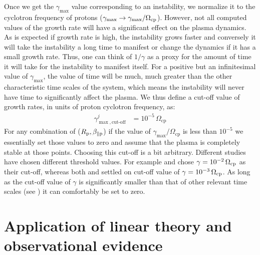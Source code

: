             Once we get the $\gamma_{\max}$ value corresponding to an instability, we normalize it
            to the cyclotron frequency of protons ($\gamma_{\max} \rightarrow
            \gamma_{\max}/\Omega_{\rm cp}$). However, not all computed values of the growth rate
            will have a significant effect on the plasma dynamics. As is expected if growth rate is
            high, the instability grows faster and conversely it will take the instability a long
            time to manifest or change the dynamics if it has a small growth rate. Thus, one can
            think of $1/\gamma$ as a proxy for the amount of time it will take for the instability
            to manifest itself. For a positive but an infinitesimal value of $\gamma_{\max}$, the
            value of time will be much, much greater than the other characteristic time scales of
            the system, which means the instability will never have time to significantly affect the
            plasma. We thus define a cut-off value of growth rates, in units of proton cyclotron
            frequency, as:
            \begin{align}
                \gamma_{\max, \mathrm{cut\textrm{-}off}}^j & = 10^{-5}\,\Omega_\mathrm{{cp}} \label{eq:gammacutoff}
            \end{align}
            For any combination of ($R_{\rm p}, \beta_{\parallel \rm p}$) if the value of
            $\gamma_{\max}/\Omega_\mathrm{{cp}}$ is less than $10^{-5}$ we essentially set those
            values to zero and assume that the plasma is completely stable at those points. Choosing
            this cut-off is a bit arbitrary. Different studies have chosen different threshold
            values. For example \citet{Gary1999} and \citet{Gary2006} chose $\gamma =
            10^{-2}\,\Omega_{\rm cp}$ as their cut-off, whereas both \citet{Hellinger2006} and
            \citet{Klein2018} settled on cut-off value of $\gamma = 10^{-3}\,\Omega_{\rm cp}$. As
            long as the cut-off value of $\gamma$ is significantly smaller than that of other
            relevant time scales (see ) it can comfortably be set to zero.

    \section{Application of linear theory and observational evidence}\label{sec:app2}

